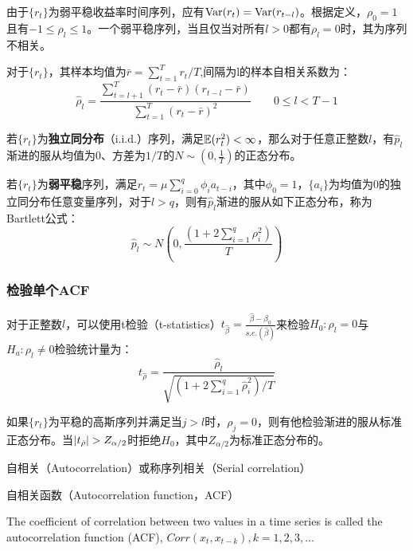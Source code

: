 \documentclass[11pt]{article}
\begin{document}
由于$\{r_t\}$为弱平稳收益率时间序列，应有$\operatorname{Var}(r_t) = \operatorname{Var}(r_{t-l})$。根据定义，$\rho_0=1$且有$-1 \leq \rho_l \leq 1$。一个弱平稳序列，当且仅当对所有$l>0$都有$\rho_l=0$时，其为序列不相关。

对于$\{r_t\}$，其样本均值为$\bar{r}=\sum_{t=1}^{T}r_t/T$,间隔为l的样本自相关系数为：
\begin{equation*}
    \hat{\rho}_l = \frac{\sum_{t=l+1}^{T}(r_t-\bar{r})(r_{t-l}-\bar{r})}{\sum_{t=1}^{T}(r_t-\bar{r})^2} \qquad 0 \leq l < T-1
\end{equation*}

若$\{r_t\}$为\textbf{独立同分布}（i.i.d.）序列，满足$\mathbb{E}(r_t^2)<\infty$，那么对于任意正整数$l$，有$\hat{p}_l$渐进的服从均值为$0$、方差为$1/T$的$N\sim(0,\frac{1}{T})$的正态分布。

若$\{r_t\}$为\textbf{弱平稳}序列，满足$r_t = \mu \sum_{i=0}^{q}\phi_i a_{t-i}$，其中$\phi_0=1$，$\{a_i\}$为均值为0的独立同分布任意变量序列，对于$l>q$，则有$\hat{p}_l$渐进的服从如下正态分布，称为Bartlett公式：
\begin{equation*}
    \hat{p}_l \sim N\left(0,\frac{\left( 1+2\sum_{i=1}^{q}\rho_i^2 \right)}{T} \right)    
\end{equation*}

\subsubsection*{检验单个ACF}

对于正整数$l$，可以使用t检验（t-statistics）$t_{\hat{\beta}} = \frac{\hat{\beta}-\beta_0}{s.e.(\hat{\beta})}$来检验$H_0: \rho_l =0$与$H_a: \rho_l \neq 0$检验统计量为：
\begin{equation*}
    t_{\hat{\rho}} = \frac{\hat{\rho}_l}{\sqrt{\left( 1+2\sum_{i=1}^{q}\hat{\rho}_i^2 \right)/T}}
\end{equation*}

如果$\{r_t\}$为平稳的高斯序列并满足当$j>l$时，$\rho_j=0$，则有他检验渐进的服从标准正态分布。当$\left\lvert t_{\hat{\rho}}\right\rvert>Z_{\alpha/2}$时拒绝$H_0$，其中$Z_{\alpha/2}$为标准正态分布的。


\divider

自相关（Autocorrelation）或称序列相关（Serial correlation）


自相关函数（Autocorrelation function，ACF）

The coefficient of correlation between two values in a time series is called the autocorrelation function (ACF), $Corr(x_t, x_{t-k}), k=1,2,3,\dotsc$
\end{document}

